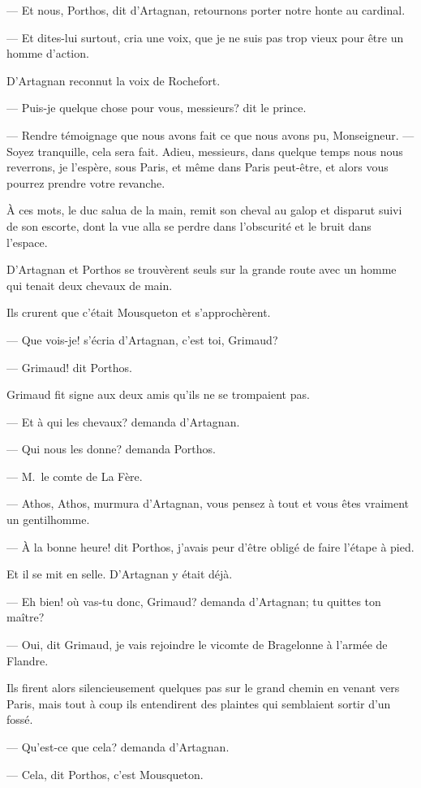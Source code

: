— Et nous, Porthos, dit d'Artagnan, retournons porter notre honte au cardinal.

— Et dites-lui surtout, cria une voix, que je ne suis pas trop vieux pour être un homme d'action.

D'Artagnan reconnut la voix de Rochefort.

— Puis-je quelque chose pour vous, messieurs? dit le prince.

— Rendre témoignage que nous avons fait ce que nous avons pu, Monseigneur.
— Soyez tranquille, cela sera fait. Adieu, messieurs, dans quelque temps nous nous reverrons, je l'espère, sous Paris, et même dans Paris peut-être, et alors vous pourrez prendre votre revanche.

À ces mots, le duc salua de la main, remit son cheval au galop et disparut suivi de son escorte, dont la vue alla se perdre dans l'obscurité et le bruit dans l'espace.

D'Artagnan et Porthos se trouvèrent seuls sur la grande route avec un homme qui tenait deux chevaux de main.

Ils crurent que c'était Mousqueton et s'approchèrent.

— Que vois-je! s'écria d'Artagnan, c'est toi, Grimaud?

— Grimaud! dit Porthos.

Grimaud fit signe aux deux amis qu'ils ne se trompaient pas.

— Et à qui les chevaux? demanda d'Artagnan.

— Qui nous les donne? demanda Porthos.

— M.~le comte de La Fère.

— Athos, Athos, murmura d'Artagnan, vous pensez à tout et vous êtes vraiment un gentilhomme.

— À la bonne heure! dit Porthos, j'avais peur d'être obligé de faire l'étape à pied.

Et il se mit en selle. D'Artagnan y était déjà.

— Eh bien! où vas-tu donc, Grimaud? demanda d'Artagnan; tu quittes ton maître?

— Oui, dit Grimaud, je vais rejoindre le vicomte de Bragelonne à l'armée de Flandre.

Ils firent alors silencieusement quelques pas sur le grand chemin en venant vers Paris, mais tout à coup ils entendirent des plaintes qui semblaient sortir d'un fossé.

— Qu'est-ce que cela? demanda d'Artagnan.

— Cela, dit Porthos, c'est Mousqueton.

